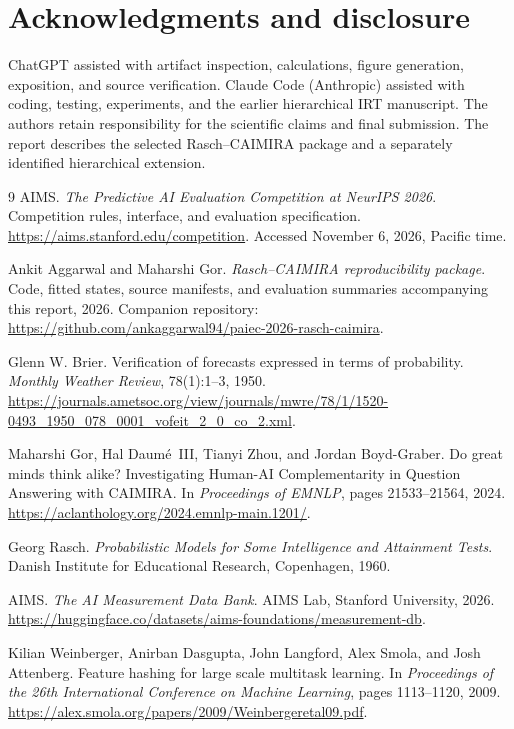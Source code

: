\section*{Acknowledgments and disclosure}
ChatGPT assisted with artifact inspection, calculations, figure generation, exposition, and source verification. Claude Code (Anthropic) assisted with coding, testing, experiments, and the earlier hierarchical IRT manuscript. The authors retain responsibility for the scientific claims and final submission. The report describes the selected Rasch--CAIMIRA package and a separately identified hierarchical extension.

\begin{thebibliography}{9}
AIMS. \emph{The Predictive AI Evaluation Competition at NeurIPS 2026}. Competition rules, interface, and evaluation specification. \url{https://aims.stanford.edu/competition}. Accessed November 6, 2026, Pacific time.

Ankit Aggarwal and Maharshi Gor. \emph{Rasch--CAIMIRA reproducibility package}. Code, fitted states, source manifests, and evaluation summaries accompanying this report, 2026. Companion repository: \url{https://github.com/ankaggarwal94/paiec-2026-rasch-caimira}.

Glenn W. Brier. Verification of forecasts expressed in terms of probability. \emph{Monthly Weather Review}, 78(1):1--3, 1950. \url{https://journals.ametsoc.org/view/journals/mwre/78/1/1520-0493_1950_078_0001_vofeit_2_0_co_2.xml}.

Maharshi Gor, Hal Daum\'{e}~III, Tianyi Zhou, and Jordan Boyd-Graber. Do great minds think alike? Investigating Human-AI Complementarity in Question Answering with CAIMIRA. In \emph{Proceedings of EMNLP}, pages 21533--21564, 2024. \url{https://aclanthology.org/2024.emnlp-main.1201/}.

Georg Rasch. \emph{Probabilistic Models for Some Intelligence and Attainment Tests}. Danish Institute for Educational Research, Copenhagen, 1960.

AIMS. \emph{The AI Measurement Data Bank}. AIMS Lab, Stanford University, 2026. \url{https://huggingface.co/datasets/aims-foundations/measurement-db}.

Kilian Weinberger, Anirban Dasgupta, John Langford, Alex Smola, and Josh Attenberg. Feature hashing for large scale multitask learning. In \emph{Proceedings of the 26th International Conference on Machine Learning}, pages 1113--1120, 2009. \url{https://alex.smola.org/papers/2009/Weinbergeretal09.pdf}.
\end{thebibliography}
